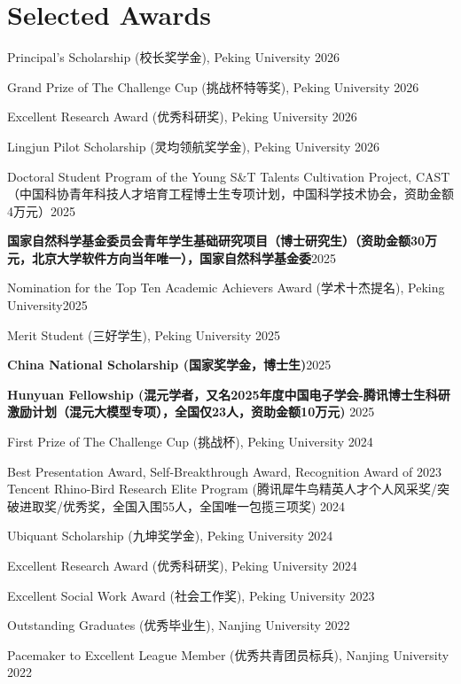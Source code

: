 \section{Selected Awards}
\begin{enumerate}[label={[\arabic*]}]
\item Principal's Scholarship (校长奖学金), Peking University \hfill 2026 
\item Grand Prize of The Challenge Cup (挑战杯特等奖), Peking University \hfill 2026
\item Excellent Research Award (优秀科研奖), Peking University \hfill 2026
\item Lingjun Pilot Scholarship (灵均领航奖学金), Peking University \hfill 2026
\item Doctoral Student Program of the Young S\&T Talents Cultivation Project, CAST（中国科协青年科技人才培育工程博士生专项计划，中国科学技术协会，资助金额4万元）\hfill 2025
\item \textbf{国家自然科学基金委员会青年学生基础研究项目（博士研究生）（资助金额30万元，北京大学软件方向当年唯一），国家自然科学基金委}\hfill 2025
\item Nomination for the Top Ten Academic Achievers Award (学术十杰提名), Peking University\hfill 2025
\item Merit Student (三好学生), Peking University \hfill 2025
\item \textbf{China National Scholarship (国家奖学金，博士生)}\hfill 2025
\item \textbf{Hunyuan Fellowship (混元学者，又名2025年度中国电子学会-腾讯博士生科研激励计划（混元大模型专项），全国仅23人，资助金额10万元)} \hfill 2025
\item First Prize of The Challenge Cup (挑战杯), Peking University \hfill 2024
\item Best Presentation Award, Self-Breakthrough Award, Recognition Award of 2023 Tencent Rhino-Bird Research Elite Program (腾讯犀牛鸟精英人才个人风采奖/突破进取奖/优秀奖，全国入围55人，全国唯一包揽三项奖) \hfill 2024
\item Ubiquant Scholarship (九坤奖学金), Peking University \hfill 2024
\item Excellent Research Award (优秀科研奖), Peking University \hfill 2024
\item Excellent Social Work Award (社会工作奖), Peking University \hfill 2023
\item Outstanding Graduates (优秀毕业生), Nanjing University \hfill 2022
\item Pacemaker to Excellent League Member  (优秀共青团员标兵), Nanjing University \hfill 2022

\end{enumerate}
